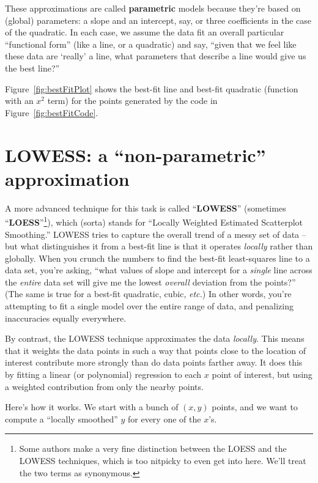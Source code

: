 These approximations are called \textbf{parametric} models because they're
based on (global) parameters: a slope and an intercept, say, or three
coefficients in the case of the quadratic. In each case, we assume the data
fit an overall particular ``functional form'' (like a line, or a quadratic) and
say, ``given that we feel like these data are `really' a line, what parameters
that describe a line would give us the best line?''

Figure~\ref{fig:bestFitPlot} shows the best-fit line and best-fit quadratic
(function with an $x^2$ term) for the points generated by the code in
Figure~\ref{fig:bestFitCode}.

\section{LOWESS: a ``non-parametric'' approximation}

A more advanced technique for this task is called ``\textbf{LOWESS}''
(sometimes ``\textbf{LOESS}''\footnote{Some authors make a very fine
distinction between the LOESS and the LOWESS techniques, which is too nitpicky
to even get into here. We'll treat the two terms as synonymous.}), which
(sorta) stands for ``Locally Weighted Estimated Scatterplot Smoothing.''
LOWESS tries to capture the overall trend of a messy set of data -- but what
distinguishes it from a best-fit line is that it operates \textit{locally}
rather than globally. When you crunch the numbers to find the best-fit
least-squares line to a data set, you're asking, ``what values of slope and
intercept for a \textit{single} line across the \textit{entire} data set will
give me the lowest \textit{overall} deviation from the points?'' (The same is
true for a best-fit quadratic, cubic, \textit{etc.}) In other words, you're
attempting to fit a single model over the entire range of data, and penalizing
inaccuracies equally everywhere.

By contrast, the LOWESS technique approximates the data \textit{locally}. This
means that it weights the data points in such a way that points close to the
location of interest contribute more strongly than do data points farther
away. It does this by fitting a linear (or polynomial) regression to each $x$
point of interest, but using a weighted contribution from only the nearby
points.

Here's how it works. We start with a bunch of $(x,y)$ points, and we want to
compute a ``locally smoothed'' $y$ for every one of the $x$'s. 

